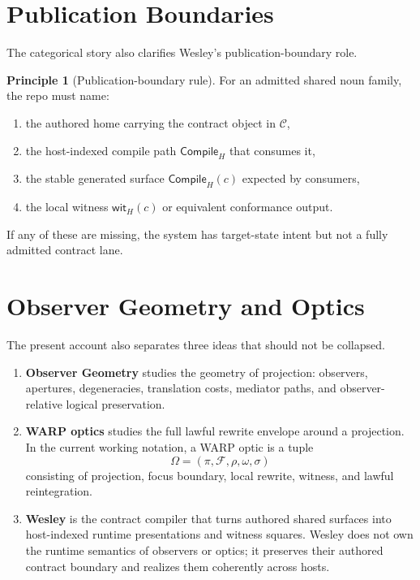 \documentclass[11pt]{article}
\newcommand{\Ctr}{\mathcal{C}}
\newcommand{\Compile}{\mathsf{Compile}}
\theoremstyle{definition}
\newtheorem{principle}{Principle}
\begin{document}
\section{Publication Boundaries}

The categorical story also clarifies Wesley's publication-boundary role.

\begin{principle}[Publication-boundary rule]
For an admitted shared noun family, the repo must name:
\begin{enumerate}[leftmargin=2em]
\item the authored home carrying the contract object in $\Ctr$,
\item the host-indexed compile path $\Compile_H$ that consumes it,
\item the stable generated surface $\Compile_H(c)$ expected by consumers,
\item the local witness $\mathsf{wit}_H(c)$ or equivalent conformance output.
\end{enumerate}
\end{principle}

If any of these are missing, the system has target-state intent but not a
fully admitted contract lane.

\section{Observer Geometry and Optics}

The present account also separates three ideas that should not be collapsed.

\begin{enumerate}[leftmargin=2em]
\item \textbf{Observer Geometry} studies the geometry of projection:
  observers, apertures, degeneracies, translation costs, mediator paths, and
  observer-relative logical preservation.

\item \textbf{WARP optics} studies the full lawful rewrite envelope around a
  projection. In the current working notation, a WARP optic is a tuple
  \[
  \Omega = (\pi,\mathcal{F},\rho,\omega,\sigma)
  \]
  consisting of projection, focus boundary, local rewrite, witness, and lawful
  reintegration.

\item \textbf{Wesley} is the contract compiler that turns authored shared
  surfaces into host-indexed runtime presentations and witness squares. Wesley
  does not own the runtime semantics of observers or optics; it preserves their
  authored contract boundary and realizes them coherently across hosts.
\end{enumerate}
\end{document}
